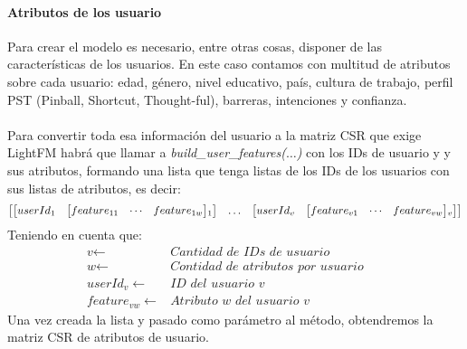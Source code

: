 \paragraph{Atributos de los usuario}
Para crear el modelo es necesario, entre otras cosas, disponer de las características de los usuarios. En este caso contamos con multitud de atributos sobre cada usuario: edad, género, nivel educativo, país, cultura de trabajo, perfil PST (Pinball, Shortcut, Thought-ful), barreras, intenciones y confianza.
\\ \\
Para convertir toda esa información del usuario a la matriz CSR que exige LightFM habrá que llamar a \textit{build\_user\_features($\ldots$)} con los IDs de usuario y y sus atributos, formando una lista que tenga listas de los IDs de los usuarios con sus listas de atributos, es decir:
\begin{align*}
    \begin{bmatrix}
        \begin{bmatrix} 
            userId$$_{1}$$ & \begin{bmatrix} feature$$_{11}$$ &\cdots & feature$$_{1w}$$ \end{bmatrix}$$_1$$
        \end{bmatrix}
        &
        \ldots
        &
        \begin{bmatrix} 
            userId$$_{v}$$ & \begin{bmatrix} feature$$_{v1}$$ &\cdots & feature$$_{vw}$$ \end{bmatrix}$$_v$$
        \end{bmatrix}
    \end{bmatrix}
\end{align*}
Teniendo en cuenta que:
\begin{align*}
    \textit{v}\gets & \textit{Cantidad de IDs de usuario }
    &&\\
    \textit{w} \gets & \textit{Contidad de atributos por usuario}
    &&\\
    \textit{userId$_{v}$} \gets & \textit{ID del usuario v}
    &&\\
    \textit{feature$_{vw}$} \gets & \textit{Atributo w del usuario v}
\end{align*}
%
Una vez creada la lista y pasado como parámetro al método, obtendremos la matriz CSR de atributos de usuario.

